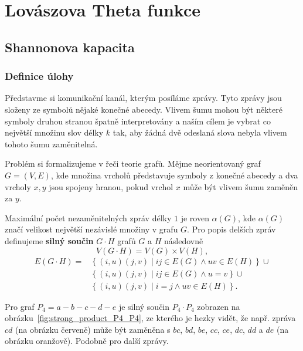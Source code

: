 \chapter{Lovászova Theta funkce}

\section{Shannonova kapacita}

\subsection*{Definice úlohy}

Představme si komunikační kanál, kterým posíláme zprávy. Tyto zprávy jsou složeny ze symbolů nějaké konečné abecedy. Vlivem šumu mohou být některé symboly druhou stranou špatně interpretovány a naším cílem je vybrat co největší množinu slov délky $k$ tak, aby žádná dvě odeslaná slova nebyla vlivem tohoto šumu zaměnitelná.

Problém si formalizujeme v řeči teorie grafů. Mějme neorientovaný graf $G = (V, E)$, kde množina vrcholů představuje symboly z konečné abecedy a dva vrcholy $x, y$ jsou spojeny hranou, pokud vrchol $x$ může být vlivem šumu zaměněn za $y$.

Maximální počet nezaměnitelných zpráv délky $1$ je roven $\alpha(G)$, kde $\alpha(G)$ značí velikost největší nezávislé množiny v grafu $G$. Pro popis delších zpráv definujeme \textbf{silný součin} $G \cdot H$ grafů $G$ a $H$ následovně
\begin{equation*}
    V(G \cdot H) = V(G) \times V(H),
\end{equation*}
\begin{equation*}
    \begin{split}
    E(G \cdot H) = &\left\{ (i,u)(j,v) \mid ij \in E(G) \wedge uv \in E(H) \right\} \cup \\
                   &\left\{ (i,u)(j,v) \mid ij \in E(G) \wedge u = v \right\} \cup \\
                   &\left\{ (i,u)(j,v) \mid i = j \wedge uv \in E(H) \right\}.
    \end{split}
\end{equation*}

\begin{pr}
Pro graf $P_4 = a-b-c-d-e$ je silný součin $P_4 \cdot P_4$ zobrazen na obrázku~\ref{fig:strong_product_P4_P4}, ze kterého je hezky vidět, že např. zpráva $cd$ (na obrázku červeně) může být zaměněna s $bc$, $bd$, $be$, $cc$, $ce$, $dc$, $dd$ a $de$ (na obrázku oranžově). Podobně pro další zprávy.
\end{pr}

